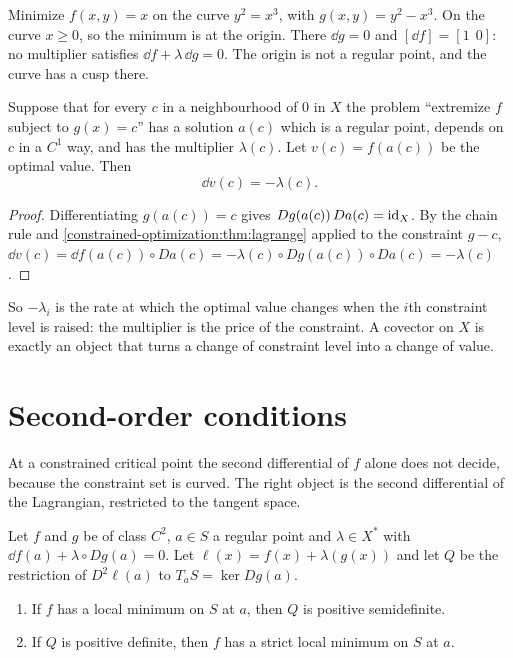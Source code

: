 \begin{notechapter}
\begin{pitfall}
Minimize $f(x, y) = x$ on the curve $y^2 = x^3$, with
$g(x, y) = y^2 - x^3$. On the curve $x\geq0$, so the minimum is at the
origin. There $\dd g = 0$ and $[\dd f] = [1\ \ 0]$: no multiplier
satisfies $\dd f + \lambda\,\dd g = 0$. The origin is not a regular point,
and the curve has a cusp there.
\end{pitfall}

\begin{proposition}
\label{constrained-optimization:prop:sensitivity}
Suppose that for every $c$ in a neighbourhood of $0$ in $X$ the problem
``extremize $f$ subject to $g(x) = c$'' has a solution $a(c)$ which is a
regular point, depends on $c$ in a $C^1$ way, and has the multiplier
$\lambda(c)$. Let $v(c) = f(a(c))$ be the optimal value. Then
\[
  \dd v(c) = -\lambda(c) .
\]
\end{proposition}

\begin{proof}
Differentiating $g(a(c)) = c$ gives $Dg(a(c))\,Da(c) = \mathrm{id}_X$. By the
chain rule and \cref{constrained-optimization:thm:lagrange} applied to the
constraint $g - c$,
$\dd v(c) = \dd f(a(c))\circ Da(c)
= -\lambda(c)\circ Dg(a(c))\circ Da(c) = -\lambda(c)$.
\end{proof}

So $-\lambda_i$ is the rate at which the optimal value changes when the
$i$th constraint level is raised: the multiplier is the price of the
constraint. A covector on $X$ is exactly an object that turns a change of
constraint level into a change of value.

\section{Second-order conditions}\label{constrained-optimization:sec:second}

At a constrained critical point the second differential of $f$ alone does
not decide, because the constraint set is curved. The right object is the
second differential of the Lagrangian, restricted to the tangent space.

\begin{theorem}
\label{constrained-optimization:thm:second}
Let $f$ and $g$ be of class $C^2$, $a\in S$ a regular point and
$\lambda\in X^*$ with $\dd f(a) + \lambda\circ Dg(a) = 0$. Let
$\ell(x) = f(x) + \lambda(g(x))$ and let $Q$ be the restriction of
$D^2\ell(a)$ to $T_aS = \ker Dg(a)$.
\begin{enumerate}[nosep]
  \item If $f$ has a local minimum on $S$ at $a$, then $Q$ is positive
        semidefinite.
  \item If $Q$ is positive definite, then $f$ has a strict local minimum
        on $S$ at $a$.
\end{enumerate}
\end{theorem}


\end{notechapter}
